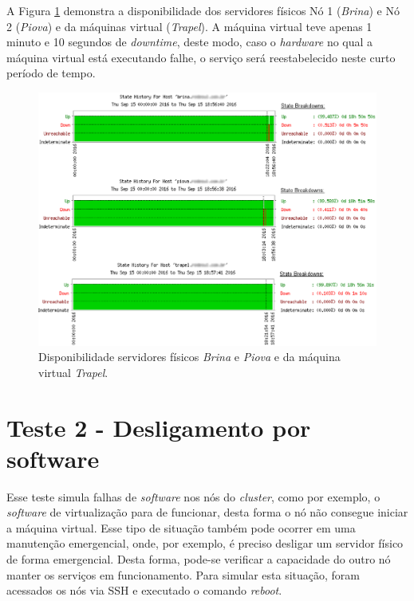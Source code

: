 A Figura \ref{fig:teste1_disponibilidade} demonstra a disponibilidade dos servidores físicos Nó 1 (\textit{Brina}) e Nó 2 (\textit{Piova}) e da 
máquinas virtual (\textit{Trapel}). A máquina virtual teve apenas 1 minuto e 10 segundos de \textit{downtime}, deste modo, caso o 
\textit{hardware} no qual a máquina virtual está executando falhe, o serviço será reestabelecido neste curto período de tempo.

\begin{figure}[h!]
 \centering
 \includegraphics[width=470px]{img/teste1_disponibilidade.eps}
 \caption{Disponibilidade servidores físicos \textit{Brina} e \textit{Piova} e da máquina virtual \textit{Trapel}.}
 \label{fig:teste1_disponibilidade}
\end{figure}


\section{Teste 2 - Desligamento por software}

Esse teste simula falhas de \textit{software} nos nós do \textit{cluster}, como por exemplo, o \textit{software} de virtualização para de funcionar,
desta forma o nó não consegue iniciar a máquina virtual. Esse tipo de situação também pode ocorrer em uma manutenção emergencial, onde, 
por exemplo, é preciso desligar um servidor físico de forma emergencial. Desta forma, pode-se verificar a capacidade do outro nó manter os serviços
em funcionamento. Para simular esta situação, foram acessados os nós via \ac{SSH} e executado o comando \textit{reboot}.

